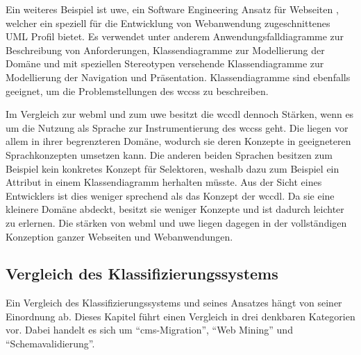         Ein weiteres Beispiel ist \gls{uwe},
        ein Software Engineering Ansatz für Webseiten \cite{koch:uwe},
        welcher ein speziell für die Entwicklung von Webanwendung zugeschnittenes
        UML Profil bietet.
        Es verwendet unter anderem Anwendungsfalldiagramme zur Beschreibung von Anforderungen,
        Klassendiagramme zur Modellierung der Domäne
        und mit speziellen Stereotypen versehende Klassendiagramme zur Modellierung der Navigation
        und Präsentation.
        Klassendiagramme sind ebenfalls geeignet, um die Problemstellungen des \glspl{wccs} zu beschreiben.

        Im Vergleich zur \gls{webml} und zum \gls{uwe} besitzt die \gls{wccdl} dennoch Stärken,
        wenn es um die Nutzung als Sprache zur Instrumentierung des \glspl{wccs} geht.
        Die liegen vor allem in ihrer begrenzteren Domäne,
        wodurch sie deren Konzepte in geeigneteren Sprachkonzepten umsetzen kann.
        Die anderen beiden Sprachen besitzen zum Beispiel kein konkretes Konzept für
        Selektoren, weshalb dazu zum Beispiel ein Attribut in einem Klassendiagramm herhalten müsste.
        Aus der Sicht eines Entwicklers ist dies weniger sprechend als das Konzept der \gls{wccdl}.
        Da sie eine kleinere Domäne abdeckt, besitzt sie weniger Konzepte
        und ist dadurch leichter zu erlernen.
        Die stärken von \gls{webml} und \gls{uwe} liegen dagegen in der vollständigen Konzeption
        ganzer Webseiten und Webanwendungen.
    
    \subsection{Vergleich des Klassifizierungssystems}
        \label{section:discussionComparisonClassificationSystem}
        Ein Vergleich des Klassifizierungssystems und seines Ansatzes
        hängt von seiner Einordnung ab.
        Dieses Kapitel führt einen Vergleich in drei denkbaren Kategorien vor.
        Dabei handelt es sich um "`\gls{cms}-Migration"', "`Web Mining"'
        und "`Schemavalidierung"'.

